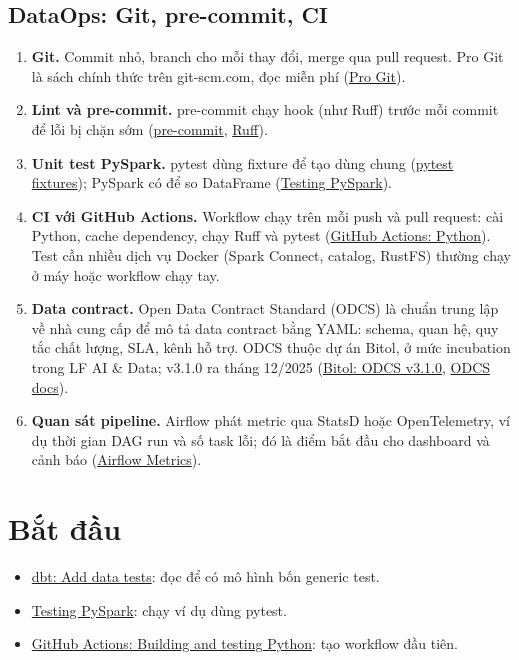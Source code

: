 \subsection{DataOps: Git, pre-commit, CI}
\begin{enumerate}[resume]
  \item \textbf{Git.} Commit nhỏ, branch cho mỗi thay đổi, merge qua pull request. Pro Git là sách chính thức trên git-scm.com, đọc miễn phí (\href{https://git-scm.com/book/en/v2}{Pro Git}).
  \item \textbf{Lint và pre-commit.} pre-commit chạy hook (như Ruff) trước mỗi commit để lỗi bị chặn sớm (\href{https://pre-commit.com/}{pre-commit}, \href{https://docs.astral.sh/ruff/}{Ruff}).
  \item \textbf{Unit test PySpark.} pytest dùng fixture để tạo  dùng chung (\href{https://docs.pytest.org/en/stable/how-to/fixtures.html}{pytest fixtures}); PySpark có  để so DataFrame (\href{https://spark.apache.org/docs/latest/api/python/getting_started/testing_pyspark.html}{Testing PySpark}).
  \item \textbf{CI với GitHub Actions.} Workflow chạy trên mỗi push và pull request: cài Python, cache dependency, chạy Ruff và pytest (\href{https://docs.github.com/en/actions/tutorials/build-and-test-code/python}{GitHub Actions: Python}). Test cần nhiều dịch vụ Docker (Spark Connect, catalog, RustFS) thường chạy ở máy hoặc workflow chạy tay.
  \item \textbf{Data contract.} Open Data Contract Standard (ODCS) là chuẩn trung lập về nhà cung cấp để mô tả data contract bằng YAML: schema, quan hệ, quy tắc chất lượng, SLA, kênh hỗ trợ. ODCS thuộc dự án Bitol, ở mức incubation trong LF AI \& Data; v3.1.0 ra tháng 12/2025 (\href{https://bitol.io/bitol-announces-odcs-v3-1-0-stronger-smarter-and-stricter/}{Bitol: ODCS v3.1.0}, \href{https://bitol-io.github.io/open-data-contract-standard/v3.1.0/}{ODCS docs}).
  \item \textbf{Quan sát pipeline.} Airflow phát metric qua StatsD hoặc OpenTelemetry, ví dụ thời gian DAG run và số task lỗi; đó là điểm bắt đầu cho dashboard và cảnh báo (\href{https://airflow.apache.org/docs/apache-airflow/stable/administration-and-deployment/logging-monitoring/metrics.html}{Airflow Metrics}).
\end{enumerate}

\section{Bắt đầu}
\begin{itemize}
  \item \href{https://docs.getdbt.com/docs/build/data-tests}{dbt: Add data tests}: đọc để có mô hình bốn generic test.
  \item \href{https://spark.apache.org/docs/latest/api/python/getting_started/testing_pyspark.html}{Testing PySpark}: chạy ví dụ dùng pytest.
  \item \href{https://docs.github.com/en/actions/tutorials/build-and-test-code/python}{GitHub Actions: Building and testing Python}: tạo workflow đầu tiên.
\end{itemize}


